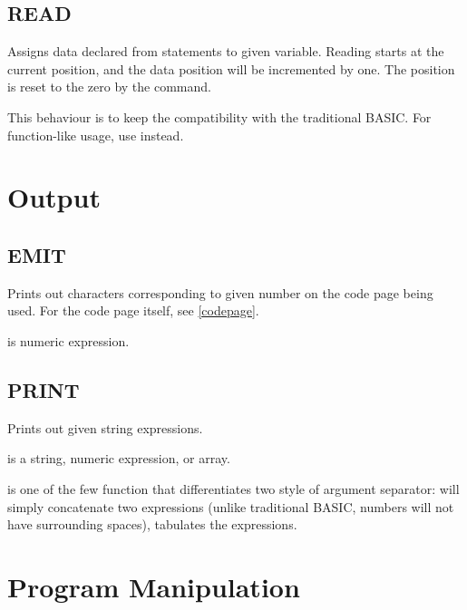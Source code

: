     \subsection{READ}
        \par
        Assigns data declared from  statements to given variable. Reading starts at the current  position, and the data position will be incremented by one. The position is reset to the zero by the  command.\par
        This behaviour is to keep the compatibility with the traditional BASIC. For function-like usage, use  instead.
        
\section{Output}

    \subsection{EMIT}
        \par
        Prints out characters corresponding to given number on the code page being used. For the code page itself, see \ref{codepage}.\par
         is numeric expression.
    \subsection{PRINT}
        \par
        Prints out given string expressions.\par
         is a string, numeric expression, or array.\par
         is one of the few function that differentiates two style of argument separator: \codebf{;} will simply concatenate two expressions (unlike traditional BASIC, numbers will not have surrounding spaces), \codebf{,} tabulates the expressions.

\section{Program Manipulation}

